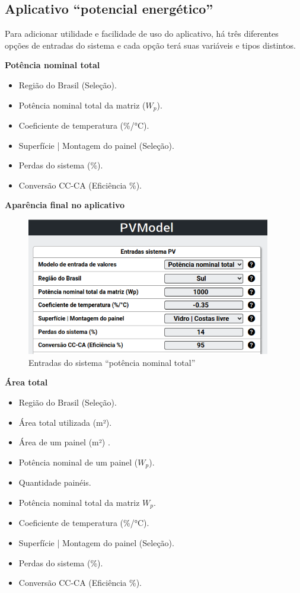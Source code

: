 \newpage

\subsection{Aplicativo ``potencial energético''}

Para adicionar utilidade e facilidade de uso do aplicativo, há três diferentes opções de entradas do sistema e cada opção terá suas variáveis e tipos distintos.

\textbf{Potência nominal total}

\begin{itemize}
   \item Região do Brasil (Seleção).
   \item Potência nominal total da matriz ($W_{p}$).
   \item Coeficiente de temperatura (\%/°C).
   \item Superfície | Montagem do painel (Seleção).
   \item Perdas do sistema (\%).
   \item Conversão CC-CA (Eficiência \%).
\end{itemize}

\textbf{Aparência final no aplicativo}

\begin{figure}[H]
    \centering
    \includegraphics[width=0.95\textwidth]{./Figuras/modelo1.png}
    \caption{Entradas do sistema ``potência nominal total''}
   \label{fig:modelo1}
\end{figure}
\newpage
\textbf{Área total}

\begin{itemize}
   \item Região do Brasil (Seleção).
   \item Área total utilizada (m²).
   \item Área de um painel (m²) .
   \item Potência nominal de um painel ($W_{p}$).
   \item Quantidade painéis.
   \item Potência nominal total da matriz $W_{p}$.
   \item Coeficiente de temperatura (\%/°C).
   \item Superfície | Montagem do painel (Seleção).
   \item Perdas do sistema (\%).
   \item Conversão CC-CA (Eficiência \%).
\end{itemize}


